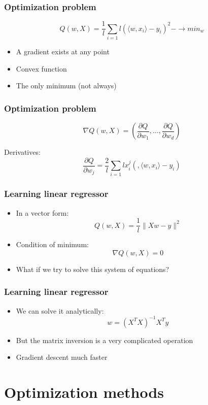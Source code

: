 \documentclass[default]{beamer}
\begin{document}
	\begin{frame}
		\frametitle{Optimization problem}
		
		\[
			Q(w,X)=\frac{1}{l}\sum_{i=1}{l}(\langle w,x_i \rangle-y_i)^2-\rightarrow min_w
		\]
		
		\begin{itemize}
			\item A gradient exists at any point
			\item Convex function
			\item The only minimum (not always)
		\end{itemize}
	\end{frame}

	\begin{frame}
		\frametitle{Optimization problem}
		
		\[
		\nabla Q(w, X)=\left(\frac{\partial Q}{\partial w_1},\dots,\frac{\partial Q}{\partial w_d} \right)
		\]
		
		Derivatives:
		\[
			\frac{\partial Q}{\partial w_j}=\frac{2}{l}\sum_{i=1}{l}x_i^j(,\langle w,x_i\rangle-y_i)
		\]
	\end{frame}
	
	
	\begin{frame}
		\frametitle{Learning linear regressor}

		\begin{itemize}
			\item In a vector form:
			\[
				Q(w,X)=\frac{1}{l}\|Xw-y\|^2
			\]
			
			\item Condition of minimum:
			\[
				\nabla Q(w,X)=0
			\]
			\item What if we try to solve this system of equations?
		\end{itemize}
	\end{frame}

	\begin{frame}
		\frametitle{Learning linear regressor}
		
		\begin{itemize}
			\item We can solve it analytically:
			\[
				w=(X^TX)^{-1}X^Ty
			\]
			
			\item But the matrix inversion is a very complicated operation
			\item Gradient descent much faster
		\end{itemize}
	\end{frame}
	
	\section{Optimization methods}
\end{document}
